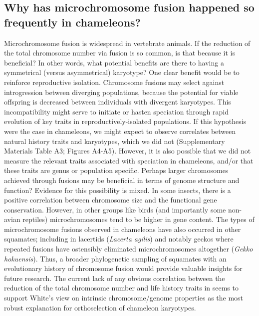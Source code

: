 \documentclass[a4paper, 12pt]{article}
\begin{document}
\subsection{Why has microchromosome fusion happened so frequently in chameleons?}
Microchromosome fusion is widespread in vertebrate animals\cite{waters2021microchromosomes}. 
If the reduction of the total chromosome number via fusion is so common, is that because it is beneficial? In other words, what potential benefits are there to having a symmetrical (versus asymmetrical) karyotype? 
One clear benefit would be to reinforce reproductive isolation. 
Chromosome fusions may select against introgression between diverging populations, because the potential for viable offspring is decreased between individuals with divergent karyotypes\cite{cicconardi2021chromosome}.
This incompatibility might serve to initiate or hasten speciation through rapid evolution of key traits in reproductively-isolated populations. If this hypothesis were the case in chameleons, we might expect to observe correlates between natural history traits and karyotypes, which we did not (Supplementary Materials Table A3; Figures A4-A5). 
However, it is also possible that we did not measure the relevant traits associated with speciation in chameleons, and/or that these traits are genus or population specific.
Perhaps larger chromosomes achieved through fusions may be beneficial in terms of genome structure and function? Evidence for this possibility is mixed. In some insects, there is a positive correlation between chromosome size and the functional gene conservation\cite{cicconardi2021chromosome}. 
However, in other groups like birds (and importantly some non-avian reptiles) microchromosomes tend to be higher in gene content\cite{waters2021microchromosomes}.
The types of microchromosome fusions observed in chameleons have also occurred in other squamates\cite{deakin2016anchoring}; including in lacertids (\textit{Lacerta agilis}\cite{srikulnath2014identification}) and notably geckos where repeated fusions have ostensibly eliminated microchromosomes altogether (\textit{Gekko hokuensis}\cite{srikulnath2015karyotype}). 
Thus, a broader phylogenetic sampling of squamates with an evolutionary history of chromosome fusion would provide valuable insights for future research. 
The current lack of any obvious correlation between the reduction of the total chromosome number and life history traits in seems to support White's\cite{white1973,white1975chromosome} view on intrinsic chromosome/genome properties as the most robust explanation for orthoselection of chameleon karyotypes.
\end{document}
